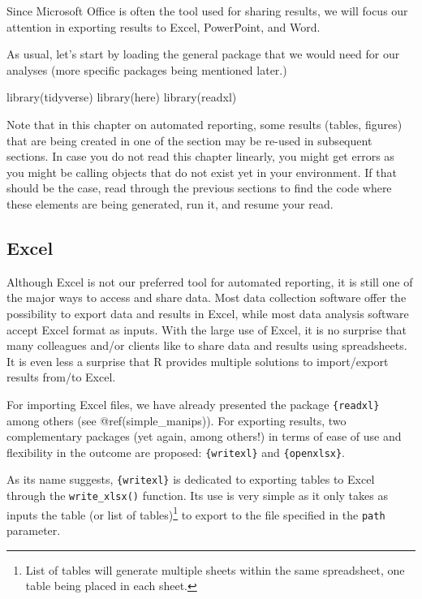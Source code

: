 \documentclass[
]{krantz}
\makeatletter
\newenvironment{Shaded}{\begin{snugshade}}{\end{snugshade}}
\newcommand{\FunctionTok}[1]{\textcolor[rgb]{0,0,0}{#1}}
\newcommand{\NormalTok}[1]{#1}
\newenvironment{kframe}{%
\medskip{}
\setlength{\fboxsep}{.8em}
 \def\at@end@of@kframe{}%
 \ifinner\ifhmode%
  \def\at@end@of@kframe{\end{minipage}}%
  \begin{minipage}{\columnwidth}%
 \fi\fi%
 \def\FrameCommand##1{\hskip\@totalleftmargin \hskip-\fboxsep
 \colorbox{shadecolor}{##1}\hskip-\fboxsep
     \hskip-\linewidth \hskip-\@totalleftmargin \hskip\columnwidth}%
 \MakeFramed {\advance\hsize-\width
   \@totalleftmargin\z@ \linewidth\hsize
   \@setminipage}}%
 {\par\unskip\endMakeFramed%
 \at@end@of@kframe}
\renewenvironment{Shaded}{\begin{kframe}}{\end{kframe}}
\makeatother
\begin{document}
Since Microsoft Office is often the tool used for sharing results, we will focus our attention in exporting results to Excel, PowerPoint, and Word.

As usual, let's start by loading the general package that we would need for our analyses (more specific packages being mentioned later.)

\begin{Shaded}
\begin{Highlighting}[]
\FunctionTok{library}\NormalTok{(tidyverse)}
\FunctionTok{library}\NormalTok{(here)}
\FunctionTok{library}\NormalTok{(readxl)}
\end{Highlighting}
\end{Shaded}

Note that in this chapter on automated reporting, some results (tables, figures) that are being created in one of the section may be re-used in subsequent sections. In case you do not read this chapter linearly, you might get errors as you might be calling objects that do not exist yet in your environment. If that should be the case, read through the previous sections to find the code where these elements are being generated, run it, and resume your read.

\hypertarget{excel}{%
\subsection{Excel}\label{excel}}

Although Excel is not our preferred tool for automated reporting, it is still one of the major ways to access and share data. Most data collection software offer the possibility to export data and results in Excel, while most data analysis software accept Excel format as inputs. With the large use of Excel, it is no surprise that many colleagues and/or clients like to share data and results using spreadsheets. It is even less a surprise that R provides multiple solutions to import/export results from/to Excel.

For importing Excel files, we have already presented the package \texttt{\{readxl\}} among others (see @ref(simple\_manips)). For exporting results, two complementary packages (yet again, among others!) in terms of ease of use and flexibility in the outcome are proposed: \texttt{\{writexl\}} and \texttt{\{openxlsx\}}.

As its name suggests, \texttt{\{writexl\}} is dedicated to exporting tables to Excel through the \texttt{write\_xlsx()} function. Its use is very simple as it only takes as inputs the table (or list of tables)\footnote{List of tables will generate multiple sheets within the same spreadsheet, one table being placed in each sheet.} to export to the file specified in the \texttt{path} parameter.
\end{document}

